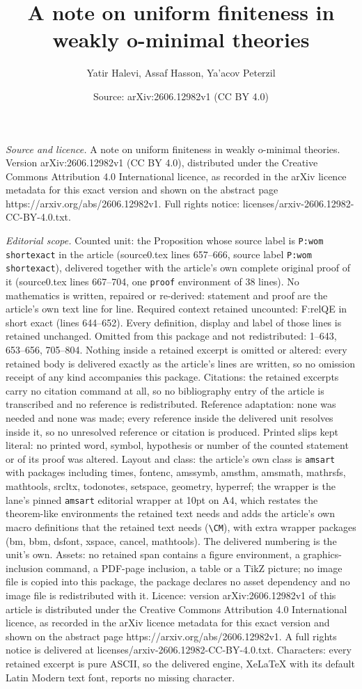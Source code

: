 \documentclass[10pt,a4paper]{amsart}
\title[A note on uniform finiteness in weakly o-minimal theories]{A note on uniform finiteness in weakly o-minimal theories}
\author{Yatir Halevi, Assaf Hasson, Ya'acov Peterzil}
\date{Source: arXiv:2606.12982v1 (CC BY 4.0)}
\begin{document}
\maketitle

\noindent\emph{Source and licence.} A note on uniform finiteness in weakly o-minimal theories. Version arXiv:2606.12982v1 (CC BY 4.0), distributed under the Creative Commons Attribution 4.0 International licence, as recorded in the arXiv licence metadata for this exact version and shown on the abstract page https://arxiv.org/abs/2606.12982v1. Full rights notice: licenses/arxiv-2606.12982-CC-BY-4.0.txt.\par\smallskip

\noindent\textit{Editorial scope.} Counted unit: the Proposition whose source label is \texttt{P:wom shortexact} in the article (source0.tex lines 657--666, source label \texttt{P:wom shortexact}), delivered together with the article's own complete original proof of it (source0.tex lines 667--704, one \texttt{proof} environment of 38 lines). No mathematics is written, repaired or re-derived: statement and proof are the article's own text line for line. Required context retained uncounted: F:relQE in short exact (lines 644--652). Every definition, display and label of those lines is retained unchanged. Omitted from this package and not redistributed: 1--643, 653--656, 705--804. Nothing inside a retained excerpt is omitted or altered: every retained body is delivered exactly as the article's lines are written, so no omission receipt of any kind accompanies this package. Citations: the retained excerpts carry no citation command at all, so no bibliography entry of the article is transcribed and no reference is redistributed. Reference adaptation: none was needed and none was made; every reference inside the delivered unit resolves inside it, so no unresolved reference or citation is produced. Printed slips kept literal: no printed word, symbol, hypothesis or number of the counted statement or of its proof was altered. Layout and class: the article's own class is \texttt{amsart} with packages including times, fontenc, amssymb, amsthm, amsmath, mathrsfs, mathtools, srcltx, todonotes, setspace, geometry, hyperref; the wrapper is the lane's pinned \texttt{amsart} editorial wrapper at 10pt on A4, which restates the theorem-like environments the retained text needs and adds the article's own macro definitions that the retained text needs (\texttt{\textbackslash CM}), with extra wrapper packages (bm, bbm, dsfont, xspace, cancel, mathtools). The delivered numbering is the unit's own. Assets: no retained span contains a figure environment, a graphics-inclusion command, a PDF-page inclusion, a table or a TikZ picture; no image file is copied into this package, the package declares no asset dependency and no image file is redistributed with it. Licence: version arXiv:2606.12982v1 of this article is distributed under the Creative Commons Attribution 4.0 International licence, as recorded in the arXiv licence metadata for this exact version and shown on the abstract page https://arxiv.org/abs/2606.12982v1. A full rights notice is delivered at licenses/arxiv-2606.12982-CC-BY-4.0.txt. Characters: every retained excerpt is pure ASCII, so the delivered engine, XeLaTeX with its default Latin Modern text font, reports no missing character.
\end{document}
